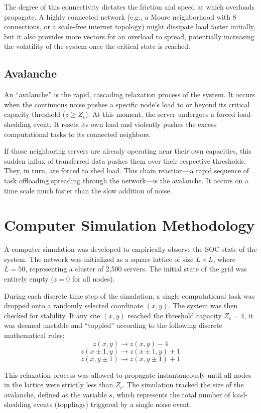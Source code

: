\documentclass[12pt,a4paper]{article}
\begin{document}
The degree of this connectivity dictates the friction and speed at which overloads propagate. A highly connected network (e.g., a Moore neighborhood with 8 connections, or a scale-free internet topology) might dissipate load faster initially, but it also provides more vectors for an overload to spread, potentially increasing the volatility of the system once the critical state is reached.

\subsection{Avalanche}
An ``avalanche'' is the rapid, cascading relaxation process of the system. It occurs when the continuous noise pushes a specific node's load to or beyond its critical capacity threshold ($z \ge Z_c$). At this moment, the server undergoes a forced load-shedding event. It resets its own load and violently pushes the excess computational tasks to its connected neighbors. 

If those neighboring servers are already operating near their own capacities, this sudden influx of transferred data pushes them over their respective thresholds. They, in turn, are forced to shed load. This chain reaction—a rapid sequence of task offloading spreading through the network—is the avalanche. It occurs on a time scale much faster than the slow addition of noise.

\section{Computer Simulation Methodology}
A computer simulation was developed to empirically observe the SOC state of the system. The network was initialized as a square lattice of size $L \times L$, where $L = 50$, representing a cluster of 2,500 servers. The initial state of the grid was entirely empty ($z = 0$ for all nodes).

During each discrete time step of the simulation, a single computational task was dropped onto a randomly selected coordinate $(x, y)$. The system was then checked for stability. If any site $(x, y)$ reached the threshold capacity $Z_c = 4$, it was deemed unstable and ``toppled'' according to the following discrete mathematical rules:
$$z(x,y) \rightarrow z(x,y) - 4$$
$$z(x \pm 1, y) \rightarrow z(x \pm 1, y) + 1$$
$$z(x, y \pm 1) \rightarrow z(x, y \pm 1) + 1$$

This relaxation process was allowed to propagate instantaneously until all nodes in the lattice were strictly less than $Z_c$. The simulation tracked the size of the avalanche, defined as the variable $s$, which represents the total number of load-shedding events (topplings) triggered by a single noise event.
\end{document}
